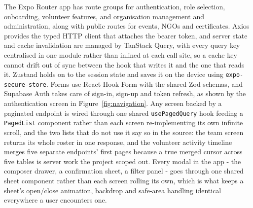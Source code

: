 \clearpage \noindent The Expo Router app has route groups for authentication, role selection, onboarding, volunteer features, and organisation management and administration, along with public routes for events, NGOs and certificates. Axios provides the typed HTTP client that attaches the bearer token, and server state and cache invalidation are managed by TanStack Query, with every query key centralised in one module rather than inlined at each call site, so a cache key cannot drift out of sync between the hook that writes it and the one that reads it. Zustand holds on to the session state and saves it on the device using \texttt{expo-secure-store}. Forms use React Hook Form with the shared Zod schemas, and Supabase Auth takes care of sign-in, sign-up and token refresh, as shown by the authentication screen in Figure~\ref{fig:navigation}. Any screen backed by a paginated endpoint is wired through one shared \texttt{usePagedQuery} hook feeding a \texttt{PagedList} component rather than each screen re-implementing its own infinite scroll, and the two lists that do not use it say so in the source: the team screen returns its whole roster in one response, and the volunteer activity timeline merges five separate endpoints' first pages because a true merged cursor across five tables is server work the project scoped out. Every modal in the app - the composer drawer, a confirmation sheet, a filter panel - goes through one shared sheet component rather than each screen rolling its own, which is what keeps a sheet's open/close animation, backdrop and safe-area handling identical everywhere a user encounters one.

